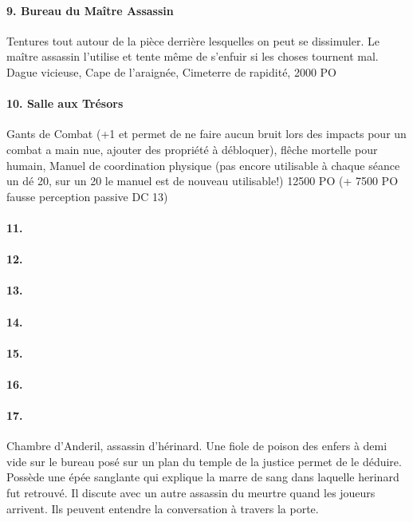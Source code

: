 \paragraph{9. Bureau du Maître Assassin}
Tentures tout autour de la pièce derrière lesquelles on peut se dissimuler. 
Le maître assassin l'utilise et tente même de s'enfuir si les choses tournent 
mal.
Dague vicieuse, Cape de l'araignée, Cimeterre de rapidité, 2000 PO

\paragraph{10. Salle aux Trésors}
Gants de Combat (+1 et permet de ne faire aucun bruit lors des impacts pour
un combat a main nue, ajouter des propriété à débloquer), flêche mortelle 
pour humain, Manuel de coordination physique (pas encore utilisable à chaque 
séance un dé 20, sur un 20 le manuel est de nouveau utilisable!)
12500 PO (+ 7500 PO fausse perception passive DC 13)

\paragraph{11. }
\paragraph{12. }
\paragraph{13. }
\paragraph{14. }
\paragraph{15. }
\paragraph{16. }
\paragraph{17. }
Chambre d'Anderil, assassin d'hérinard. Une fiole de poison des enfers 
à demi vide sur le 
bureau posé sur un plan du temple de la justice permet de le déduire.
Possède une épée sanglante qui explique la marre de sang dans laquelle 
herinard fut retrouvé. Il discute avec un autre assassin du meurtre quand 
les joueurs arrivent. Ils peuvent entendre la conversation à travers la porte.


